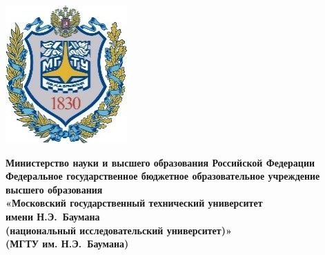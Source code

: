 \begin{titlepage}
	\noindent
    \begin{minipage}{0.15\textwidth}
		\includegraphics[width=\linewidth]{../data/bmstu_logo.jpg}
	\end{minipage}
	\fontsize{12pt}{12pt}\selectfont
	\noindent
    \begin{minipage}{0.85\textwidth}\centering
            \textbf{Министерство науки и высшего образования Российской
                    Федерации}\\
            \textbf{Федеральное государственное бюджетное образовательное
                    учреждение высшего образования}\\
            \textbf{«Московский государственный технический университет~\\имени
                    Н.Э.~Баумана}\\
            \textbf{(национальный исследовательский университет)»}\\
            \textbf{(МГТУ им. Н.Э.~Баумана)}
	\end{minipage}
    \begin{spacing}{0.2}
        ~\\
    \end{spacing}


\end{titlepage}

